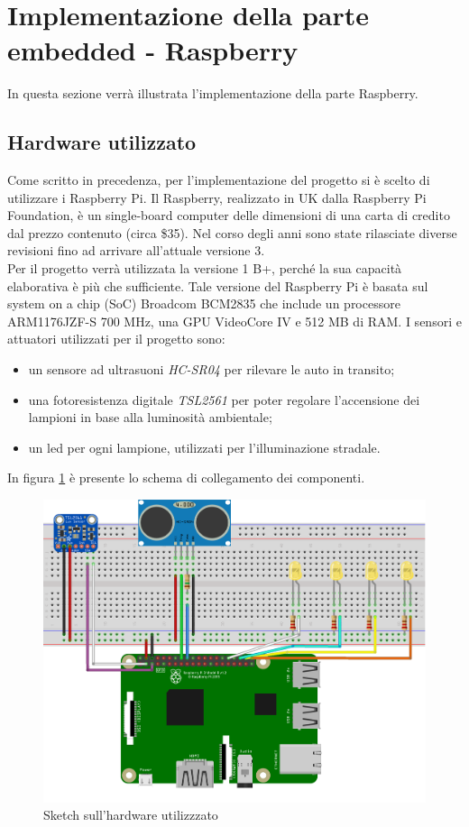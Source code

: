 \section{Implementazione della parte embedded - Raspberry}
In questa sezione verrà illustrata l'implementazione della parte Raspberry.

\subsection{Hardware utilizzato}
Come scritto in precedenza, per l'implementazione del progetto si è scelto di utilizzare i Raspberry Pi.
Il Raspberry, realizzato in UK dalla Raspberry Pi Foundation, è un single-board computer delle dimensioni di una carta di credito dal prezzo contenuto (circa \$35).
Nel corso degli anni sono state rilasciate diverse revisioni fino ad arrivare all’attuale versione 3.
\\Per il progetto verrà utilizzata la versione 1 B+, perché la sua capacità elaborativa è più che sufficiente.
Tale versione del Raspberry Pi è basata sul system on a chip (SoC) Broadcom BCM2835 che include un processore ARM1176JZF-S 700 MHz, una GPU VideoCore IV e 512 MB di RAM.
I sensori e attuatori utilizzati per il progetto sono:
\begin{itemize}
 \item un sensore ad ultrasuoni \textit{HC-SR04} per rilevare le auto in transito;
 \item una fotoresistenza digitale \textit{TSL2561} per poter regolare l'accensione dei lampioni in base alla luminosità ambientale;
 \item un led per ogni lampione, utilizzati per l'illuminazione stradale.
\end{itemize}
In figura \ref{sketch} è presente lo schema di collegamento dei componenti.
\begin{figure}[tbp]
	\centering
	\includegraphics[width=13cm]{figure/Sketch_rpi.png}
	\caption{Sketch sull'hardware utilizzzato \label{sketch}}
\end{figure}

